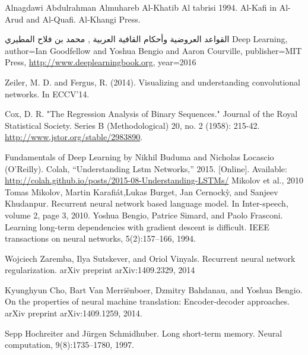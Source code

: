 \makeatletter
\renewcommand{\ps@plain}{%
\renewcommand\@oddhead{\hfil\normalfont\textrm{\thepage}}%
\renewcommand\@evenhead{}%
\renewcommand\@oddfoot{}%
\renewcommand\@evenfoot{}%
}
\makeatother
\pagestyle{myheadings}
\renewcommand\bibname{\uppercase{References}}
\begin{thebibliography}{999}

 Alnagdawi
Abdulrahman Almuhareb
 Al-Khatib Al tabrisi 1994. Al-Kafi in Al-Arud and Al-Quafi. Al-Khangi Press.

\textarabic{القواعد العروضية وأحكام القافية العربية , محمد بن فلاح المطيري}
 Deep Learning,
    author={Ian Goodfellow and Yoshua Bengio and Aaron Courville},
    publisher={MIT Press},
    \url{http://www.deeplearningbook.org},
    year={2016}

 Zeiler, M. D. and Fergus, R. (2014). Visualizing and understanding convolutional networks. In ECCV’14.

       Cox, D. R. "The Regression Analysis of Binary Sequences." Journal of the Royal Statistical Society. Series B (Methodological) 20, no. 2 (1958): 215-42. \url{http://www.jstor.org/stable/2983890}.

Fundamentals of Deep Learning by Nikhil Buduma and Nicholas Locascio (O’Reilly).
 Colah, “Understanding Lstm Networks,” 2015. [Online]. Available: \url{http://colah.github.io/posts/2015-08-Understanding-LSTMs/}
 Mikolov et al., 2010 Tomas Mikolov, Martin Karafiát,Lukas Burget, Jan Cernockỳ, and Sanjeev Khudanpur. Recurrent neural network based language model. In Inter-speech, volume 2, page 3, 2010.
 Yoshua Bengio, Patrice Simard, and Paolo Frasconi. Learning long-term dependencies with gradient descent is difficult. IEEE transactions on neural networks, 5(2):157–166, 1994.

 Wojciech Zaremba, Ilya Sutskever, and Oriol Vinyals. Recurrent neural network regularization. arXiv preprint arXiv:1409.2329, 2014

 Kyunghyun Cho, Bart Van Merriënboer, Dzmitry Bahdanau, and Yoshua Bengio. On the properties of neural machine translation: Encoder-decoder approaches. arXiv preprint arXiv:1409.1259, 2014.

 Sepp Hochreiter and Jürgen Schmidhuber. Long short-term memory. Neural computation, 9(8):1735–1780, 1997.


\end{thebibliography}
